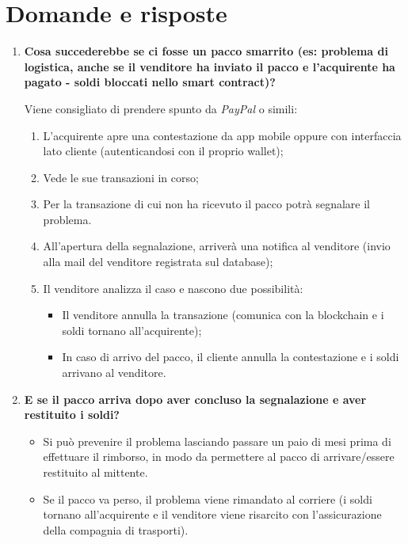 \documentclass[11pt]{article}
\begin{document}
		\section{Domande e risposte}
			\begin{enumerate}
				\item \textbf{Cosa succederebbe se ci fosse un pacco smarrito (es: problema di logistica, anche se il venditore
				ha inviato il pacco e l'acquirente ha pagato - soldi bloccati nello smart contract)?}
				
				\medskip		
						
				Viene consigliato di prendere spunto da \textit{PayPal} o simili: 
				\begin{enumerate}
					\item L'acquirente apre una contestazione da app mobile oppure con interfaccia lato cliente
					(autenticandosi con il proprio wallet);
					\item Vede le sue transazioni in corso;
					\item Per la transazione di cui non ha ricevuto il pacco potrà segnalare il problema.
					\item All'apertura della segnalazione, arriverà una notifica al venditore (invio alla mail del venditore
					registrata sul database);
					\item Il venditore analizza il caso e nascono due possibilità: 
						\begin{itemize}
							\item Il venditore annulla la transazione (comunica con la blockchain e i soldi tornano all'acquirente); 
							\item In caso di arrivo del pacco, il cliente annulla la contestazione e i soldi arrivano
							al venditore.
						\end{itemize}
				\end{enumerate}
				
				\bigskip
				
				\item \textbf{E se il pacco arriva dopo aver concluso la segnalazione e aver restituito i soldi?}
				
				\medskip
				
				\begin{itemize}
					\item Si può prevenire il problema lasciando passare un paio di mesi prima di effettuare il rimborso,
					in modo da permettere al pacco di arrivare/essere restituito al mittente.
					\item Se il pacco va perso, il problema viene rimandato al corriere (i soldi tornano all'acquirente e il
					venditore viene risarcito con l'assicurazione della compagnia di trasporti).
				\end{itemize}
				

\end{enumerate}
\end{document}
